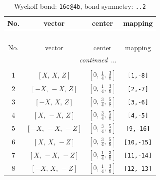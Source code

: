 \documentclass[fleqn,8pt]{jsarticle}
\begin{document}
\begin{longtable}{cccc}
\caption{Wyckoff bond: {\tt 16e@4b}, bond symmetry: {\tt ..2}}
 \\
 \hline \hline
No. & vector & center & mapping \\ \hline \endfirsthead

\multicolumn{3}{l}{\tablename\ \thetable{}} \\
 \hline \hline
No. & vector & center & mapping \\ \hline \endhead

 \hline \hline
\multicolumn{3}{r}{\footnotesize\it continued ...} \\ \endfoot

 \hline \hline
\multicolumn{3}{r}{} \\ \endlastfoot

1 & $\left[ X,\, X,\, Z \right]$ & $\left[ 0,\, \frac{1}{4},\, \frac{3}{8} \right]$ & {\tt [1,-8]} \\ \hline
2 & $\left[ - X,\, - X,\, Z \right]$ & $\left[ 0,\, \frac{1}{4},\, \frac{3}{8} \right]$ & {\tt [2,-7]} \\ \hline
3 & $\left[ - X,\, X,\, Z \right]$ & $\left[ 0,\, \frac{3}{4},\, \frac{5}{8} \right]$ & {\tt [3,-6]} \\ \hline
4 & $\left[ X,\, - X,\, Z \right]$ & $\left[ 0,\, \frac{3}{4},\, \frac{5}{8} \right]$ & {\tt [4,-5]} \\ \hline
5 & $\left[ - X,\, - X,\, - Z \right]$ & $\left[ 0,\, \frac{3}{4},\, \frac{5}{8} \right]$ & {\tt [9,-16]} \\ \hline
6 & $\left[ X,\, X,\, - Z \right]$ & $\left[ 0,\, \frac{3}{4},\, \frac{5}{8} \right]$ & {\tt [10,-15]} \\ \hline
7 & $\left[ X,\, - X,\, - Z \right]$ & $\left[ 0,\, \frac{1}{4},\, \frac{3}{8} \right]$ & {\tt [11,-14]} \\ \hline
8 & $\left[ - X,\, X,\, - Z \right]$ & $\left[ 0,\, \frac{1}{4},\, \frac{3}{8} \right]$ & {\tt [12,-13]} \\
\end{longtable}
\renewcommand{\arraystretch}{1.2}
\end{document}
